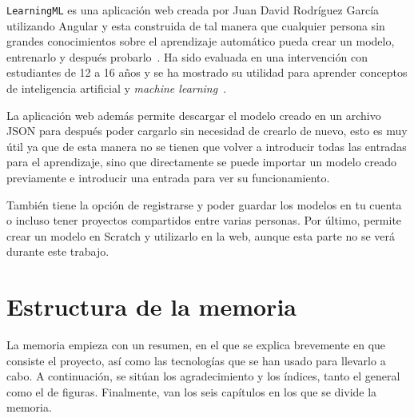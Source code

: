 \documentclass[a4paper, 12pt]{book}
\begin{document}
\texttt{LearningML} es una aplicación web creada por Juan David Rodríguez García utilizando Angular y esta construida de tal manera que cualquier persona sin grandes conocimientos sobre el aprendizaje automático pueda crear un modelo, entrenarlo y después probarlo~\cite{garcia2020learningml,rodriguez2020introducing}. Ha sido evaluada en una intervención con estudiantes de 12 a 16 años y se ha mostrado su utilidad para aprender conceptos de inteligencia artificial y \emph{machine learning}~\cite{rodriguez2021evaluation}.

La aplicación web además permite descargar el modelo creado en un archivo JSON para después poder cargarlo sin necesidad de crearlo de nuevo, esto es muy útil ya que de esta manera no se tienen que volver a introducir todas las entradas para el aprendizaje, sino que directamente se puede importar un modelo creado previamente e introducir una entrada para ver su funcionamiento.

También tiene la opción de registrarse y poder guardar los modelos en tu cuenta o incluso tener proyectos compartidos entre varias personas. Por último, permite crear un modelo en Scratch y utilizarlo en la web, aunque esta parte no se verá durante este trabajo.


\section{Estructura de la memoria}
\label{sec:estructura}

La memoria empieza con un resumen, en el que se explica brevemente en que consiste el proyecto, así como las tecnologías que se han usado para llevarlo a cabo. A continuación, se sitúan los agradecimiento y los índices, tanto el general como el de figuras. Finalmente, van los seis capítulos en los que se divide la memoria.
\end{document}
